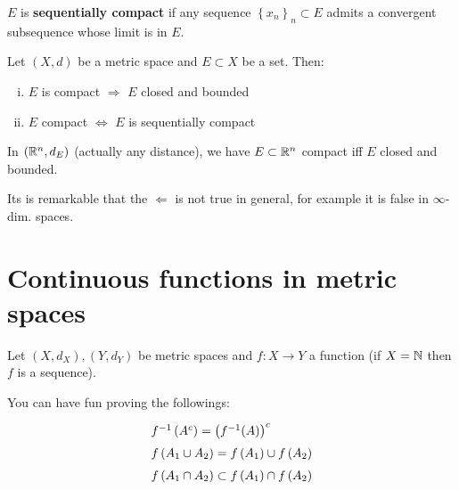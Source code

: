 \begin{defn}
$E$ is \textbf{sequentially compact} if any sequence $\left\{ x_n \right\}_n\subset E$ admits a convergent subsequence whose limit is in $E$.
\end{defn}

\begin{thm}
Let $(X,d)$ be a metric space and $E\subset X$ be a set. Then:
\begin{enumerate}[(i)]
    \item $E$ is compact $\Longrightarrow$ $E$ closed and bounded
    \item $E$ compact $\Longleftrightarrow$ $E$ is sequentially compact
\end{enumerate}
\end{thm}

\begin{thm}
In $\left( \mathbb{R}^n,d_E \right)$ (actually any distance), we have $E\subset\mathbb{R}^n$ compact iff $E$ closed and bounded.
\end{thm}

Its is remarkable that the $\Longleftarrow$ is not true in general, for example it is false in $\infty$-dim. spaces.


\newpage

\section{Continuous functions in metric spaces} %
\label{sec:continuous_functions_in_metric_spaces}

Let $\left( X,d_X \right),\left( Y,d_Y \right)$ be metric spaces and $f:X\to Y$ a function (if $X=\mathbb{N}$ then $f$ is a sequence).

\begin{marker}
You can have fun proving the followings:
\begin{equation*}
\left.
{\renewcommand*{\arraystretch}{1.5}
\begin{array}{l}
f^{-1}\left( A^c \right)=\left( f^{-1}(A) \right)^c \\
f\left( A_1\cup A_2 \right)=f\left( A_1 \right)\cup f\left( A_2 \right) \\
f\left( A_1\cap A_2 \right)\subset f\left( A_1 \right)\cap f\left( A_2 \right)
\end{array}}
\right.\end{equation*}
\end{marker}

